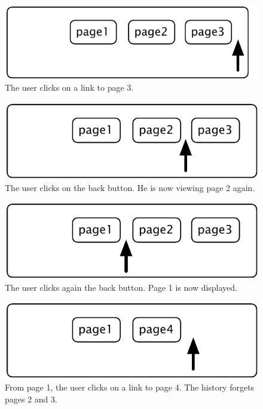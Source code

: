 \documentclass[a4paper,10pt,twoside]{book}
\begin{document}
{\begin{figure}[!ht]
\centerline{\includegraphics[scale=0.5]{page3Stef}}
\caption{The user clicks on a link to page 3.}
\vspace{.2in}
\end{figure}

\begin{figure}[!ht]
\centerline{\includegraphics[scale=0.5]{page2_Stef}}
\caption{The user clicks on the back button. He is now viewing page 2 again.}
\vspace{.2in}
\end{figure}

\begin{figure}[!ht]
\centerline{\includegraphics[scale=0.5]{page1_Stef}}
\caption{The user clicks again the back button. Page 1 is now displayed.}
\vspace{.2in}
\end{figure}

\begin{figure}[!ht]
\centerline{\includegraphics[scale=0.5]{page4Stef}}
\caption{From page 1, the user clicks on a link to page 4. The history forgets pages 2 and 3.}
\vspace{.2in}
\end{figure}

}
\end{document}
